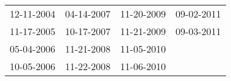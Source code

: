 \begin{supertabular}{llll}
 12-11-2004 &  04-14-2007 &  11-20-2009 &  09-02-2011 \\
 11-17-2005 &  10-17-2007 &  11-21-2009 &  09-03-2011 \\
 05-04-2006 &  11-21-2008 &  11-05-2010 &             \\
 10-05-2006 &  11-22-2008 &  11-06-2010 &             \\
\end{supertabular}
